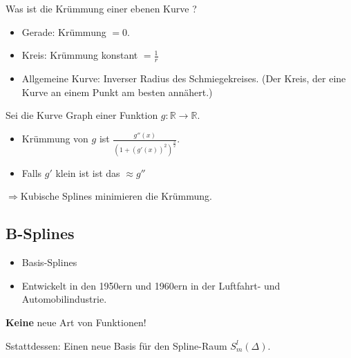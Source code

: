 Was ist die Krümmung einer ebenen Kurve ?
\begin{itemize}
  \item Gerade: Krümmung $=0$.
  \item Kreis: Krümmung konstant $= \frac{1}{r}$
  \item Allgemeine Kurve: Inverser Radius des Schmiegekreises.
    (Der Kreis, der eine Kurve an einem Punkt am besten annähert.)

\begin{center}
\end{center}

\end{itemize}
Sei die Kurve Graph einer Funktion $g:\mathbb{R}\rightarrow\mathbb{R}$.

\begin{itemize}
  \item Krümmung von $g$ ist $\frac{g''(x)}{\left(1+(g'(x))^2\right)^{\frac{3}{2}}}$.
  \item Falls $g'$ klein ist ist das $\approx g''$
\end{itemize}

$\Rightarrow$\glqq Kubische Splines minimieren die Krümmung\grqq.

\subsection{B-Splines}

\begin{itemize}
 \item Basis-Splines

 \item Entwickelt in den 1950ern und 1960ern in der Luftfahrt- und Automobilindustrie.
\end{itemize}

\textbf{Keine} neue Art von Funktionen!

\medskip

Sstattdessen: Einen neue Basis für den Spline-Raum $S_m^l(\Delta)$.

